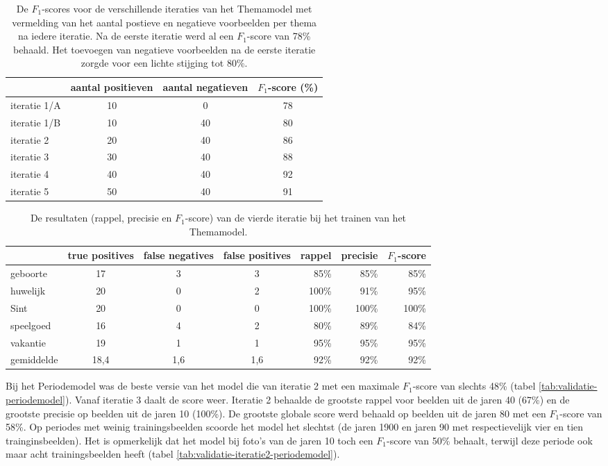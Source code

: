 \begin{table}
	\centering
	\renewcommand\arraystretch{1.2}
	\begin{tabular}{l|cc|c}
		\toprule
		& aantal positieven  &  aantal negatieven & $F_1$-score (\%)\\
		\midrule
		iteratie 1/A & 10 & 0 & 78 \\
		iteratie 1/B & 10 & 40 & 80 \\
		iteratie 2 & 20 & 40 & 86 \\
		iteratie 3 & 30 & 40 & 88 \\
		iteratie 4 & 40 & 40 & 92 \\
		iteratie 5 & 50 & 40 & 91 \\
		\bottomrule
	\end{tabular}
	\caption[$F_1$-scores voor de verschillende iteraties van het Themamodel]{De $F_1$-scores voor de verschillende iteraties van het Themamodel met vermelding van het aantal postieve en negatieve voorbeelden per thema na iedere iteratie. Na de eerste iteratie werd al een $F_1$-score van 78\% behaald. Het toevoegen van negatieve voorbeelden na de eerste iteratie zorgde voor een lichte stijging tot 80\%. }
	\label{tab:validatie-themamodel}
\end{table}


\begin{table}
	\centering
	\renewcommand\arraystretch{1.2}
	\begin{tabular}{l|ccc|rrr}
		\toprule
		& true positives  & false negatives & false positives & rappel & precisie & $F_1$-score \\
		\midrule
		geboorte & 17 & 3 & 3 & 85\% & 85\% & 85\% \\
		huwelijk & 20 & 0 & 2 & 100\% & 91\% & 95\% \\
		Sint & 20 & 0 & 0 & 100\% & 100\% & 100\% \\
		speelgoed & 16 & 4 & 2 & 80\% & 89\% & 84\% \\
		vakantie & 19 & 1 & 1 & 95\% & 95\% & 95\% \\
		\midrule
		gemiddelde & 18,4 & 1,6 & 1,6 & 92\% & 92\% & 92\% \\
		\bottomrule
	\end{tabular}
	\caption[Scores van de vierde iteratie van het Themamodel]{De resultaten (rappel, precisie en $F_1$-score) van de vierde iteratie bij het trainen van het Themamodel.}
	\label{tab:validatie-iteratie4-themamodel}
\end{table}

Bij het Periodemodel was de beste versie van het model die van iteratie 2 met een maximale $F_1$-score van slechts 48\% (tabel \ref{tab:validatie-periodemodel}). Vanaf iteratie 3 daalt de score weer. Iteratie 2 behaalde de grootste rappel voor beelden uit de jaren 40 (67\%) en de grootste precisie op beelden uit de jaren 10 (100\%). De grootste globale score werd behaald op beelden uit de jaren 80 met een $F_1$-score van 58\%. Op periodes met weinig trainingsbeelden scoorde het model het slechtst (de jaren 1900 en jaren 90 met respectievelijk vier en tien trainginsbeelden). Het is opmerkelijk dat het model bij foto's van de jaren 10 toch een $F_1$-score van 50\% behaalt, terwijl deze periode ook maar acht trainingsbeelden heeft (tabel \ref{tab:validatie-iteratie2-periodemodel}).

